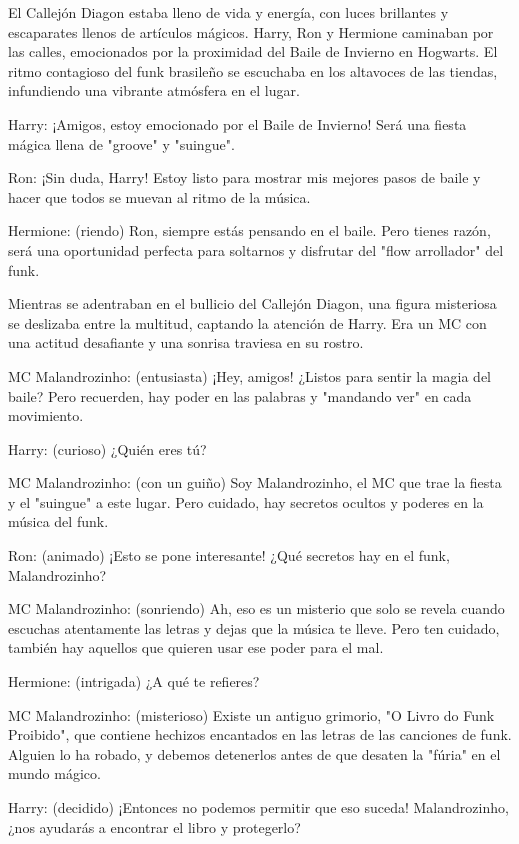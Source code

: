 El Callejón Diagon estaba lleno de vida y energía, con luces brillantes y escaparates llenos de artículos mágicos. Harry, Ron y Hermione caminaban por las calles, emocionados por la proximidad del Baile de Invierno en Hogwarts. El ritmo contagioso del funk brasileño se escuchaba en los altavoces de las tiendas, infundiendo una vibrante atmósfera en el lugar.

Harry: ¡Amigos, estoy emocionado por el Baile de Invierno! Será una fiesta mágica llena de "groove" y "suingue".

Ron: ¡Sin duda, Harry! Estoy listo para mostrar mis mejores pasos de baile y hacer que todos se muevan al ritmo de la música.

Hermione: (riendo) Ron, siempre estás pensando en el baile. Pero tienes razón, será una oportunidad perfecta para soltarnos y disfrutar del "flow arrollador" del funk.

Mientras se adentraban en el bullicio del Callejón Diagon, una figura misteriosa se deslizaba entre la multitud, captando la atención de Harry. Era un MC con una actitud desafiante y una sonrisa traviesa en su rostro.

MC Malandrozinho: (entusiasta) ¡Hey, amigos! ¿Listos para sentir la magia del baile? Pero recuerden, hay poder en las palabras y "mandando ver" en cada movimiento.

Harry: (curioso) ¿Quién eres tú?

MC Malandrozinho: (con un guiño) Soy Malandrozinho, el MC que trae la fiesta y el "suingue" a este lugar. Pero cuidado, hay secretos ocultos y poderes en la música del funk.

Ron: (animado) ¡Esto se pone interesante! ¿Qué secretos hay en el funk, Malandrozinho?

MC Malandrozinho: (sonriendo) Ah, eso es un misterio que solo se revela cuando escuchas atentamente las letras y dejas que la música te lleve. Pero ten cuidado, también hay aquellos que quieren usar ese poder para el mal.

Hermione: (intrigada) ¿A qué te refieres?

MC Malandrozinho: (misterioso) Existe un antiguo grimorio, "O Livro do Funk Proibido", que contiene hechizos encantados en las letras de las canciones de funk. Alguien lo ha robado, y debemos detenerlos antes de que desaten la "fúria" en el mundo mágico.

Harry: (decidido) ¡Entonces no podemos permitir que eso suceda! Malandrozinho, ¿nos ayudarás a encontrar el libro y protegerlo?


